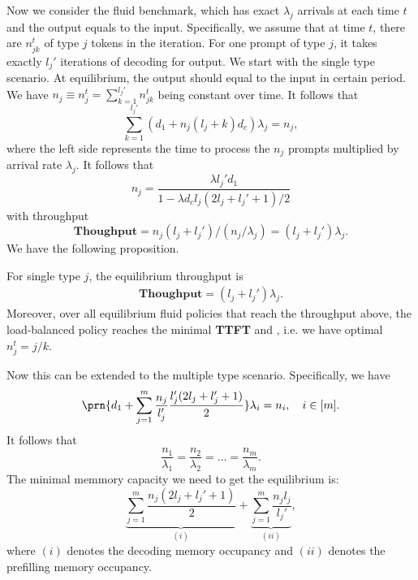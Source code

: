 \documentclass[opre, nonblindrev]{informs3} %
\newcommand{\throughput}{\textbf{Thoughput}}
\begin{document}
Now we consider the fluid benchmark, which has exact $\lambda_j$ arrivals at each time $t$ and the output equals to the input. Specifically, we assume that at time $t$, there are $n_{jk}^t$ of type $j$ tokens in the iteration. For one prompt of type $j$, it takes exactly $l_j'$ iterations of decoding for output. We start with the single type scenario. At equilibrium, the output should equal to the input in certain period. We have $n_j\equiv n_j^t = \sum_{k=1}^{l_j'}n_{jk}^t$ being constant over time. It follows that 
\begin{equation}
    \sum_{k=1}^{l_j'}(d_1+n_j(l_j+k)d_c) \lambda_j = n_j,
\end{equation}
where the left side represents the time to process the $n_j$ prompts multiplied by arrival rate $\lambda_j$. It follows that 
\begin{equation}
    n_j = \frac{\lambda l_j'd_1}{1-\lambda d_cl_j(2l_j+l_j'+1)/2}
\end{equation}
with throughput 
\begin{equation}
    \throughput = n_j(l_j+l_j') / (n_j/\lambda_j) = (l_j+l_j')\lambda_j.
\end{equation}
We have the following proposition.
\begin{proposition}
    \label{prop:throughput_fluid_single}
    For single type $j$, the equilibrium throughput is 
    \begin{align*}
        \throughput = (l_j+l_j')\lambda_j.
    \end{align*}
    Moreover, over all equilibrium fluid policies that reach the throughput above, the load-balanced policy reaches the minimal \textbf{TTFT} and , i.e. we have optimal $n_j^t = j/k.$
\end{proposition}

Now this can be extended to the multiple type scenario. Specifically, we have 
\begin{equation}
    \label{eq:fluid_equations}
   \prn{d_1+ \sum_{j=1}^m \frac{n_j}{l_j'}\frac{l_j'(2l_j+l_j'+1)}{2}}\lambda_i = n_i,\quad i\in[m].
\end{equation}
It follows that
\begin{equation*}
    \frac{n_1}{\lambda_1} = \frac{n_2}{\lambda_2} = \dots = \frac{n_m}{\lambda_m}.
\end{equation*}
The minimal memmory capacity we need to get the equilibrium is:
\begin{equation}
   \underset{(i)}{ \underbrace{\sum_{j=1}^m \frac{n_j(2l_j+l_j'+1)}{2}}}  + \underset{(ii)}{\underbrace{\sum_{j=1}^m\frac{n_jl_j}{l_j'} }},
\end{equation}
where $(i)$ denotes the decoding memory occupancy and $(ii)$ denotes the prefilling memory occupancy.
\end{document}
